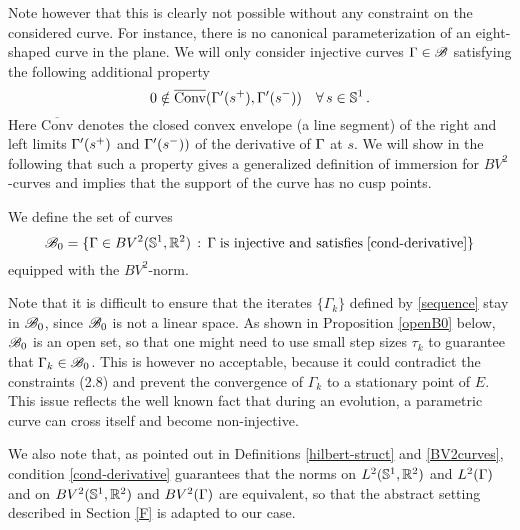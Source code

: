 Note however that this is clearly not possible without any constraint on the considered curve. For instance, there is no canonical parameterization of an eight-shaped curve in the plane. We will only consider injective curves $\Gamma \in \mathcal{B}$ satisfying the following additional property 
\begin{equation}\label{cond-derivative}
	0\notin \overline{\text{Conv}}(\Gamma'(s^+),\Gamma'(s^-)) \quad \forall \, s\in \mathbb{S}^1\,.
\end{equation}
Here $\overline{\text{Conv}}$ denotes the closed convex envelope (a line segment) of the right and left limits $\Gamma'(s^+)$ and $\Gamma'(s^-))$ of the derivative of $\Gamma$ at $s$. We will show in the following that such a property gives a generalized definition of immersion for  $BV^2$-curves and implies that the support of the curve has no cusp points. 
\par We define the set of curves
\begin{equation}
	\mathcal{B}_0 = \{ \Gamma \in BV^2(\mathbb{S}^1,\mathbb{R}^2) 
	\,:\,
		\Gamma\;\mbox{is injective and satisfies}\;\eqref{cond-derivative}
	\}
\end{equation}
equipped with the $BV^2$-norm. 

Note that it is difficult to ensure that the iterates $\{\Gamma_k\}$ defined by \eqref{sequence} stay in $\mathcal{B}_0$, since $\mathcal{B}_0$ is not a linear space. As shown in Proposition \ref{openB0} below, $\mathcal{B}_0$ is an open set, so that one might need to use small step sizes $\tau_k$ to guarantee that $\Gamma_k \in \mathcal{B}_0$. This is however no acceptable, because it could contradict the constraints (2.8) and prevent the convergence of $\Gamma_k$ to a stationary point of $E$. This issue reflects the well known fact that during an evolution, a parametric curve can cross itself and become non-injective. 


We also note that, as pointed out in Definitions \ref{hilbert-struct} and \ref{BV2curves}, condition \eqref{cond-derivative} guarantees that the norms on $L^2(\mathbb{S}^1, \mathbb{R}^2)$ and $L^2(\Gamma)$ and on $BV^2(\mathbb{S}^1, \mathbb{R}^2)$ and $BV^2(\Gamma)$ are equivalent, so that the abstract setting described in Section \ref{F} is adapted to our case.

